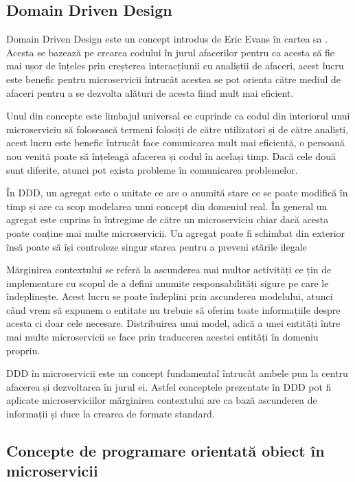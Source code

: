 \subsection{Domain Driven Design}
Domain Driven Design este un concept introdus de Eric Evans în cartea sa \cite{ddd}. Acesta se bazează
pe crearea codului în jurul afacerilor pentru ca acesta să fie mai ușor de înțeles prin creșterea
interacțiunii cu analiștii de afaceri, acest lucru este benefic pentru microservicii întrucât acestea se 
pot orienta către mediul de afaceri pentru a se dezvolta alături de acesta fiind mult mai eficient.

Unul din concepte este limbajul universal ce cuprinde ca codul din interiorul unui microserviciu să 
folosească termeni folosiți de către utilizatori și de către analiști, acest lucru este benefic întrucât
face comunicarea mult mai eficientă, o persoană nou venită poate să înțeleagă afacerea și codul în același timp.
Dacă cele două sunt diferite, atunci pot exista probleme în comunicarea problemelor.

În DDD, un agregat este o unitate ce are o anumită stare ce se poate modifică în timp și are ca scop
modelarea unui concept din domeniul real. În general un agregat este cuprins în întregime de către
un microserviciu chiar dacă acesta poate conține mai multe microservicii. Un agregat poate fi schimbat
din exterior însă poate să își controleze singur starea pentru a preveni stările ilegale

Mărginirea contextului se referă la ascunderea mai multor activități ce țin de implementare
cu scopul de a defini anumite responsabilități sigure pe care le îndeplinește. Acest lucru se
poate îndeplini prin ascunderea modelului, atunci când vrem să expunem o entitate nu trebuie să
oferim toate informațiile despre acesta ci doar cele necesare. Distribuirea unui model, adică a
unei entități între mai multe microservicii se face prin traducerea acestei entități în domeniu propriu.

DDD în microservicii este un concept fundamental întrucât ambele pun la centru afacerea și
dezvoltarea în jurul ei. Astfel conceptele prezentate în DDD pot fi aplicate microserviciilor
mărginirea contextului are ca bază ascunderea de informații și duce la crearea de formate standard.

\subsection{Concepte de programare orientată obiect în microservicii}

